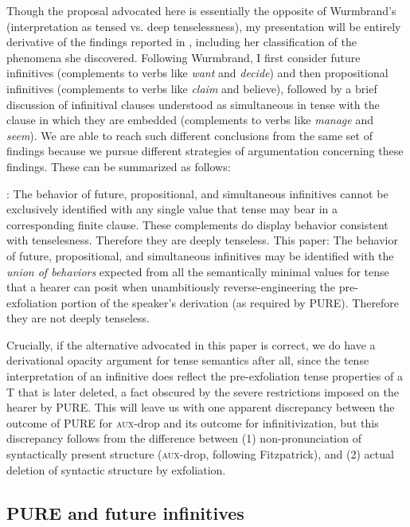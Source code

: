 \documentclass[output=paper]{langscibook}
\begin{document}
\begin{sloppypar}
Though the proposal advocated here is essentially the opposite of Wurmbrand's (interpretation as tensed vs. deep tenselessness), my presentation will be entirely derivative of the findings reported in \citet{Wurmbrand:2014aa}, including her classification of the phenomena she discovered. Following Wurmbrand, I first consider future infinitives (complements to verbs like \textit{want} and \textit{decide}) and then propositional infinitives (complements to verbs like \textit{claim} and believe), followed by a brief discussion of infinitival clauses understood as simultaneous in tense with the clause in which they are embedded (complements to verbs like \textit{manage} and \textit{seem}). We are able to reach such different conclusions from the same set of findings because we pursue different strategies of argumentation concerning these findings. These can be summarized as follows:\largerpage
\end{sloppypar}

\pex
{}
\a \citet{Wurmbrand:2014aa}: The behavior of future, propositional, and simultaneous infinitives cannot be exclusively identified with any single value that tense may bear in a corresponding finite clause. These complements do display behavior consistent with tenselesness.  Therefore they are deeply tenseless.
\a This paper: The behavior of future, propositional, and simultaneous infinitives may be identified with the \textit{union of behaviors} expected from all the semantically minimal values for tense that a hearer can posit when unambitiously reverse-engineering the pre-exfoliation portion of the speaker's derivation (as required by PURE).  Therefore they are not deeply tenseless.
\xe

Crucially, if the alternative advocated in this paper is correct, we do have a derivational opacity argument for tense semantics after all, since the tense interpretation of an infinitive does reflect the pre-exfoliation tense properties of a T that is later deleted, a fact obscured by the severe restrictions imposed on the hearer by PURE. This will leave us with one apparent discrepancy between the outcome of PURE for \textsc{aux}-drop and its outcome for infinitivization, but this discrepancy follows from the difference between (1) non-pronunciation of syntactically present structure (\textsc{aux}-drop, following Fitzpatrick), and (2) actual deletion of syntactic structure by exfoliation.

\subsection{PURE and future infinitives}
\end{document}
